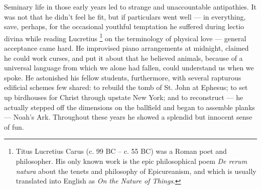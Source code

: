   Seminary life in those early years led to strange and unaccountable antipathies. 
It was not that he didn't feel he fit, but if particulars went
well --- in everything, save, perhaps, for the occasional youthful temptation he
suffered during lectio 
divina while reading Lucretius 
\footnote{Titus Lucretius Carus (c. 99 BC -- c. 55 BC) was
a Roman poet and philosopher. His only known work is the epic philosophical poem
\textit{De rerum natura} about the tenets and philosophy of Epicureanism, and which is
usually translated into English as \textit{On the Nature of Things}. 
}
on the terminology of physical love --- general acceptance came hard. He improvised 
piano arrangements at
midnight, claimed he could work curses, and put it about that he believed
animals, because of a universal language from which we alone had fallen, could
understand us when we spoke. He astonished his fellow students, furthermore,
with several rapturous 
edificial schemes few shared: to rebuild the tomb of St.
John at Ephesus; 
to set up birdhouses for Christ through upstate New York; and
to reconstruct --- he actually stepped off the dimensions on the ballfield and began
to assemble planks 
--- Noah's Ark. Throughout these years he showed a splendid but
innocent sense of fun.

